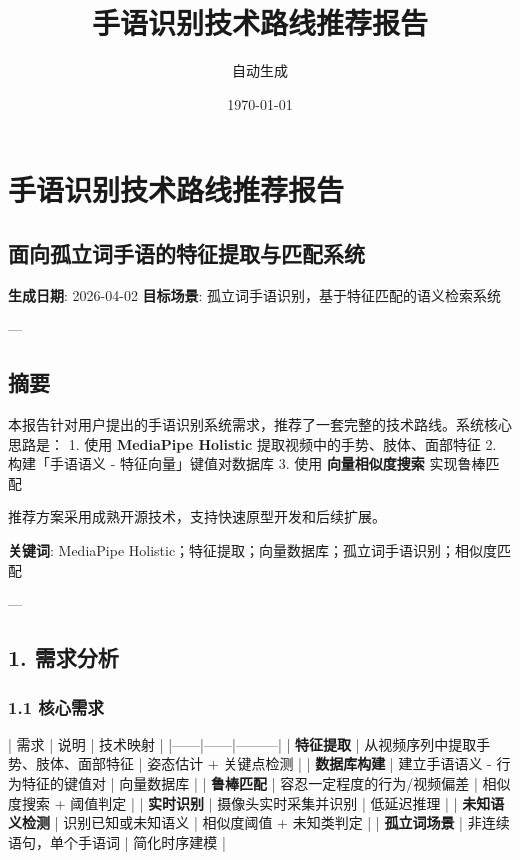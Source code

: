 \documentclass[a4paper,12pt]{article}
\title{\textbf{手语识别技术路线推荐报告}}
\author{自动生成}
\date{\today}
\begin{document}
\maketitle

\section{手语识别技术路线推荐报告}

\subsection{面向孤立词手语的特征提取与匹配系统}

\textbf{生成日期}: 2026-04-02  
\textbf{目标场景}: 孤立词手语识别，基于特征匹配的语义检索系统

---

\subsection{摘要}

本报告针对用户提出的手语识别系统需求，推荐了一套完整的技术路线。系统核心思路是：
1. 使用 \textbf{MediaPipe Holistic} 提取视频中的手势、肢体、面部特征
2. 构建「手语语义 - 特征向量」键值对数据库
3. 使用 \textbf{向量相似度搜索} 实现鲁棒匹配

推荐方案采用成熟开源技术，支持快速原型开发和后续扩展。

\textbf{关键词}: MediaPipe Holistic；特征提取；向量数据库；孤立词手语识别；相似度匹配

---

\subsection{1. 需求分析}

\subsubsection{1.1 核心需求}

| 需求 | 说明 | 技术映射 |
|------|------|---------|
| \textbf{特征提取} | 从视频序列中提取手势、肢体、面部特征 | 姿态估计 + 关键点检测 |
| \textbf{数据库构建} | 建立手语语义 - 行为特征的键值对 | 向量数据库 |
| \textbf{鲁棒匹配} | 容忍一定程度的行为/视频偏差 | 相似度搜索 + 阈值判定 |
| \textbf{实时识别} | 摄像头实时采集并识别 | 低延迟推理 |
| \textbf{未知语义检测} | 识别已知或未知语义 | 相似度阈值 + 未知类判定 |
| \textbf{孤立词场景} | 非连续语句，单个手语词 | 简化时序建模 |
\end{document}
